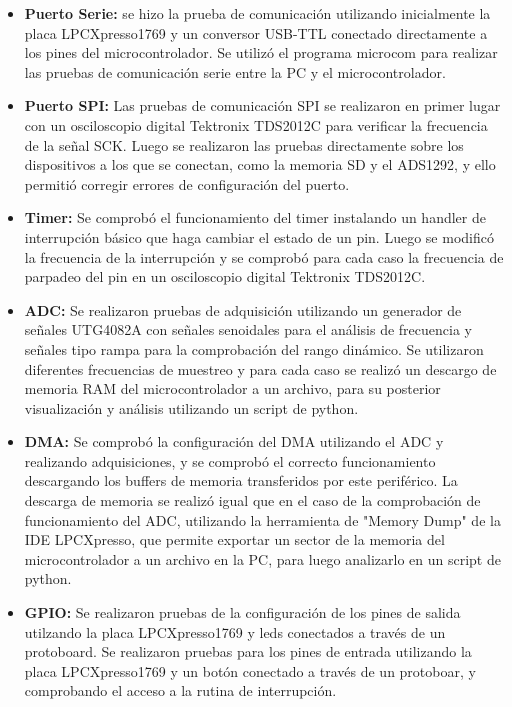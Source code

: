 \begin{itemize}

\item \textbf{Puerto Serie:} se hizo la prueba de comunicación utilizando inicialmente la placa LPCXpresso1769 y un conversor USB-TTL conectado directamente a los pines del microcontrolador. Se utilizó el programa microcom \citep{ubuntu2016} para realizar las pruebas de comunicación serie entre la PC y el microcontrolador.

\item \textbf{Puerto SPI:} Las pruebas de comunicación SPI se realizaron en primer lugar con un osciloscopio digital Tektronix TDS2012C para verificar la frecuencia de la señal SCK. Luego se realizaron las pruebas directamente sobre los dispositivos a los que se conectan, como la memoria SD y el ADS1292, y ello permitió corregir errores de configuración del puerto.

\item \textbf{Timer:} Se comprobó el funcionamiento del timer instalando un handler de interrupción básico que haga cambiar el estado de un pin. Luego se modificó la frecuencia de la interrupción y se comprobó para cada caso la frecuencia de parpadeo del pin en un osciloscopio digital Tektronix TDS2012C.

\item \textbf{ADC:} Se realizaron pruebas de adquisición utilizando un generador de señales UTG4082A con señales senoidales para el análisis de frecuencia y señales tipo rampa para la comprobación del rango dinámico. Se utilizaron diferentes frecuencias de muestreo y para cada caso se realizó un descargo de memoria RAM del microcontrolador a un archivo, para su posterior visualización y análisis utilizando un script de python.

\item \textbf{DMA:} Se comprobó la configuración del DMA utilizando el ADC y realizando adquisiciones, y se comprobó el correcto funcionamiento descargando los buffers de memoria transferidos por este periférico. La descarga de memoria se realizó igual que en el caso de la comprobación de funcionamiento del ADC, utilizando la herramienta de "Memory Dump" de la IDE LPCXpresso, que permite exportar un sector de la memoria del microcontrolador a un archivo en la PC, para luego analizarlo en un script de python.

\item \textbf{GPIO:} Se realizaron pruebas de la configuración de los pines de salida utilzando la placa LPCXpresso1769 y leds conectados a través de un protoboard. Se realizaron pruebas para los pines de entrada utilizando la placa LPCXpresso1769 y un botón conectado a través de un protoboar, y comprobando el acceso a la rutina de interrupción.


\end{itemize}
